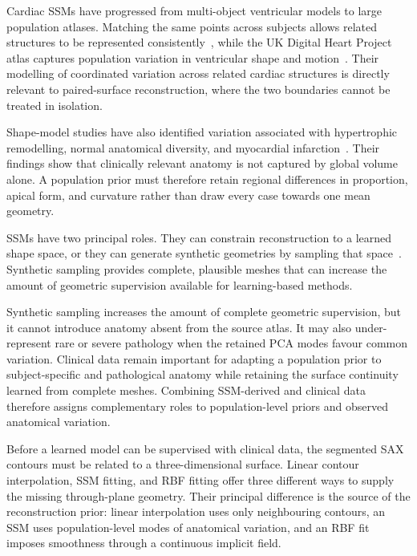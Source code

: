 Cardiac SSMs have progressed from multi-object ventricular models to large
population atlases. Matching the same points across subjects allows related
structures to be represented consistently~\parencite{frangi2002cardiacssm},
while the UK Digital Heart Project atlas captures population variation in
ventricular shape and motion~\parencite{bai2015biventricularatlas}. Their
modelling of coordinated variation across related cardiac structures is directly
relevant to paired-surface reconstruction, where the two boundaries cannot be
treated in isolation.

Shape-model studies have also identified variation associated with hypertrophic
remodelling, normal anatomical diversity, and myocardial infarction~\parencite{demarvao2014atlas,medrano2014lvshapevariation,suinesiaputra2018infarctchallenge}.
Their findings show that clinically relevant anatomy is not captured by global
volume alone. A population prior must therefore retain regional differences in
proportion, apical form, and curvature rather than draw every case towards one
mean geometry.

SSMs have two principal roles. They can constrain reconstruction to a learned
shape space, or they can generate synthetic geometries by sampling that space~\parencite{heimann2009ssmreview,khalafvand2018lvflowssm}. Synthetic sampling
provides complete, plausible meshes that can increase the amount of geometric
supervision available for learning-based methods.

Synthetic sampling increases the amount of complete geometric supervision, but
it cannot introduce anatomy absent from the source atlas. It may also
under-represent rare or severe pathology when the retained PCA modes favour
common variation. Clinical data remain important for adapting a population prior
to subject-specific and pathological anatomy while retaining the surface
continuity learned from complete meshes. Combining SSM-derived and clinical data
therefore assigns complementary roles to population-level priors and observed
anatomical variation.

Before a learned model can be supervised with clinical data, the segmented SAX
contours must be related to a three-dimensional surface. Linear contour
interpolation, SSM fitting, and RBF fitting offer three
different ways to supply the missing through-plane geometry. Their principal
difference is the source of the reconstruction prior: linear interpolation uses
only neighbouring contours, an SSM uses population-level modes of anatomical
variation, and an RBF fit imposes smoothness through a continuous implicit field.

